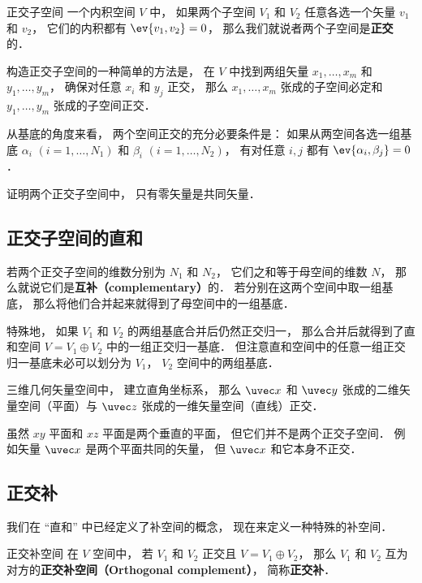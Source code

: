 
\begin{issues}
\issueTODO
\end{issues}


\begin{definition}{正交子空间}
一个内积空间 $V$ 中， 如果两个子空间 $V_1$ 和 $V_2$ 任意各选一个矢量 ${v_1}$ 和 ${v_2}$， 它们的内积都有 $\ev{v_1, v_2} = 0$， 那么我们就说者两个子空间是\textbf{正交}的．
\end{definition}

构造正交子空间的一种简单的方法是， 在 $V$ 中找到两组矢量 $x_1, \dots, x_m$ 和 $y_1, \dots, y_m$， 确保对任意 $x_i$ 和 $y_j$ 正交， 那么 $x_1, \dots, x_m$ 张成的子空间必定和 $y_1, \dots, y_m$ 张成的子空间正交．

\begin{theorem}{}
从基底的角度来看， 两个空间正交的充分必要条件是： 如果从两空间各选一组基底 ${\alpha_i}$ $(i = 1, \dots, N_1)$ 和 ${\beta_i}$ $(i = 1, \dots, N_2)$， 有对任意 $i, j$ 都有 $\ev{\alpha_i, \beta_j} = 0$．
\end{theorem}

\begin{exercise}{}
证明两个正交子空间中， 只有零矢量是共同矢量．
\end{exercise}

\subsection{正交子空间的直和}

若两个正交子空间的维数分别为 $N_1$ 和 $N_2$， 它们之和等于母空间的维数 $N$， 那么就说它们是\textbf{互补（complementary）}的． 若分别在这两个空间中取一组基底， 那么将他们合并起来就得到了母空间中的一组基底．

特殊地， 如果 $V_1$ 和 $V_2$ 的两组基底合并后仍然正交归一， 那么合并后就得到了直和空间 $V = V_1 \oplus V_2$ 中的一组正交归一基底． 但注意直和空间中的任意一组正交归一基底未必可以划分为 $V_1$， $V_2$ 空间中的两组基底．

\begin{example}{}
三维几何矢量空间中， 建立直角坐标系， 那么 $\uvec x$ 和 $\uvec y$ 张成的二维矢量空间（平面）与 $\uvec z$ 张成的一维矢量空间（直线）正交．
\end{example}

\begin{example}{}
虽然 $xy$ 平面和 $xz$ 平面是两个垂直的平面， 但它们并不是两个正交子空间． 例如矢量 $\uvec x$ 是两个平面共同的矢量， 但 $\uvec x$ 和它本身不正交．
\end{example}

\subsection{正交补}
我们在 “直和” 中已经定义了补空间的概念， 现在来定义一种特殊的补空间．
\begin{definition}{正交补空间}\label{OrthSp_def1}
在 $V$ 空间中， 若 $V_1$ 和 $V_2$ 正交且 $V = V_1 \oplus V_2$， 那么 $V_1$ 和 $V_2$ 互为对方的\textbf{正交补空间（Orthogonal complement）}， 简称\textbf{正交补}．
\end{definition}
